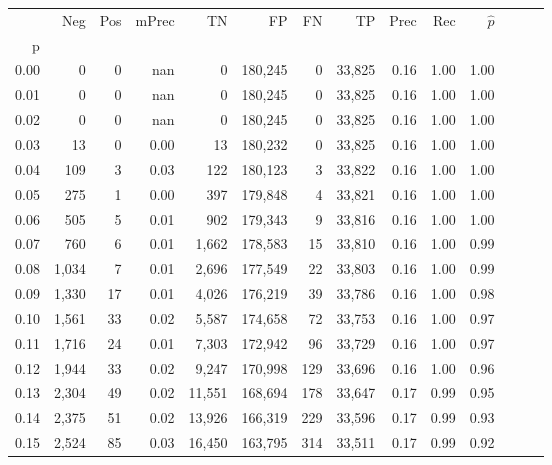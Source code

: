 \begin{tabular}{rrrrrrrrrrrrrr}
\toprule
{} &    Neg &  Pos & mPrec &       TN &       FP &      FN &      TP &  Prec &   Rec & $\hat{p}$ \\
p    &        &      &       &          &          &         &         &       &       &           \\
\midrule
0.00 &      0 &    0 &   nan &        0 &  180,245 &       0 &  33,825 &  0.16 &  1.00 &      1.00 \\
0.01 &      0 &    0 &   nan &        0 &  180,245 &       0 &  33,825 &  0.16 &  1.00 &      1.00 \\
0.02 &      0 &    0 &   nan &        0 &  180,245 &       0 &  33,825 &  0.16 &  1.00 &      1.00 \\
0.03 &     13 &    0 &  0.00 &       13 &  180,232 &       0 &  33,825 &  0.16 &  1.00 &      1.00 \\
0.04 &    109 &    3 &  0.03 &      122 &  180,123 &       3 &  33,822 &  0.16 &  1.00 &      1.00 \\
0.05 &    275 &    1 &  0.00 &      397 &  179,848 &       4 &  33,821 &  0.16 &  1.00 &      1.00 \\
0.06 &    505 &    5 &  0.01 &      902 &  179,343 &       9 &  33,816 &  0.16 &  1.00 &      1.00 \\
0.07 &    760 &    6 &  0.01 &    1,662 &  178,583 &      15 &  33,810 &  0.16 &  1.00 &      0.99 \\
0.08 &  1,034 &    7 &  0.01 &    2,696 &  177,549 &      22 &  33,803 &  0.16 &  1.00 &      0.99 \\
0.09 &  1,330 &   17 &  0.01 &    4,026 &  176,219 &      39 &  33,786 &  0.16 &  1.00 &      0.98 \\
0.10 &  1,561 &   33 &  0.02 &    5,587 &  174,658 &      72 &  33,753 &  0.16 &  1.00 &      0.97 \\
0.11 &  1,716 &   24 &  0.01 &    7,303 &  172,942 &      96 &  33,729 &  0.16 &  1.00 &      0.97 \\
0.12 &  1,944 &   33 &  0.02 &    9,247 &  170,998 &     129 &  33,696 &  0.16 &  1.00 &      0.96 \\
0.13 &  2,304 &   49 &  0.02 &   11,551 &  168,694 &     178 &  33,647 &  0.17 &  0.99 &      0.95 \\
0.14 &  2,375 &   51 &  0.02 &   13,926 &  166,319 &     229 &  33,596 &  0.17 &  0.99 &      0.93 \\
0.15 &  2,524 &   85 &  0.03 &   16,450 &  163,795 &     314 &  33,511 &  0.17 &  0.99 &      0.92 \\

\end{tabular}

